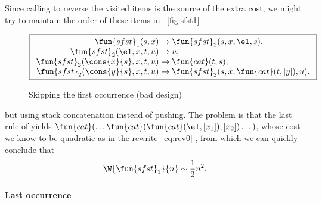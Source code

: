 Since calling  to reverse the
visited items is the source of the extra cost, we might try to
maintain the order of these items in \fig~\vref{fig:sfst1}
\begin{figure}[b]
\begin{equation*}
\boxed{%
\begin{array}{r@{\;}l@{\;}l}
\fun{sfst}_1(s,x)               & \rightarrow
                                & \fun{sfst}_2(s,x,\el,s).\\
\fun{sfst}_2(\el,x,t,u)         & \rightarrow & u;\\
\fun{sfst}_2(\cons{x}{s},x,t,u) & \rightarrow & \fun{cat}(t,s);\\
\fun{sfst}_2(\cons{y}{s},x,t,u) & \rightarrow
                                & \fun{sfst}_2(s,x,\fun{cat}(t,[y]),u).
\end{array}}
\end{equation*}
\caption{Skipping the first occurrence (bad design)}
\label{fig:sfst1}
\end{figure}
but using stack concatenation instead of pushing. The problem is that
the last rule of 
 yields
\(\fun{cat}(\dots\fun{cat}(\fun{cat}(\el,[x_1]),[x_2])\dots)\), whose
cost we know to be quadratic  as in the
rewrite~\eqref{eq:rev0}
, from which we can
quickly conclude that
\begin{equation*}
  \W{\fun{sfst}_1}{n} \sim \frac{1}{2}n^2.
\end{equation*}

\paragraph{Last occurrence}

